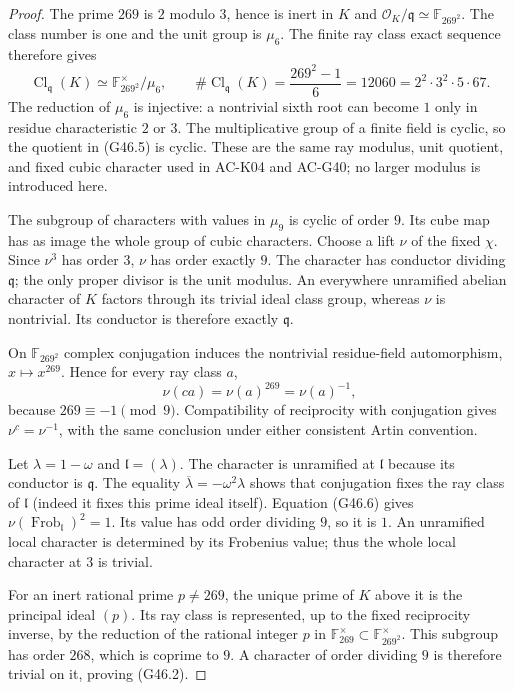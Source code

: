 \begin{proof}
The prime $269$ is $2$ modulo $3$, hence is inert in $K$ and
$\mathcal O_K/\mathfrak q\simeq\mathbb F_{269^2}$.
The class number is one and the unit group is $\mu_6$.
The finite ray class exact sequence therefore gives
\[
 \operatorname{Cl}_{\mathfrak q}(K)
       \simeq\mathbb F_{269^2}^{\times}/\mu_6,
 \qquad
 \#\operatorname{Cl}_{\mathfrak q}(K)
       =\frac{269^2-1}{6}
       =12060=2^2\cdot3^2\cdot5\cdot67.                \tag{G46.5}
\]
The reduction of $\mu_6$ is injective: a nontrivial sixth root
can become $1$ only in residue characteristic $2$ or $3$.
The multiplicative group of a finite field is cyclic, so the
quotient in (G46.5) is cyclic.  These are the same ray modulus,
unit quotient, and fixed cubic character used in AC-K04 and
AC-G40; no larger modulus is introduced here.

The subgroup of characters with values in $\mu_9$ is cyclic
of order $9$.  Its cube map has as image the whole group of
cubic characters.  Choose a lift $\nu$ of the fixed $\chi$.
Since $\nu^3$ has order $3$, $\nu$ has order exactly $9$.
The character has conductor dividing $\mathfrak q$; the only
proper divisor is the unit modulus.  An everywhere unramified
abelian character of $K$ factors through its trivial ideal class
group, whereas $\nu$ is nontrivial.  Its conductor is therefore
exactly $\mathfrak q$.

On $\mathbb F_{269^2}$ complex conjugation induces the
nontrivial residue-field automorphism, $x\mapsto x^{269}$.
Hence for every ray class $a$,
\[
          \nu(ca)=\nu(a)^{269}=\nu(a)^{-1},            \tag{G46.6}
\]
because $269\equiv-1\pmod9$.  Compatibility of reciprocity
with conjugation gives $\nu^c=\nu^{-1}$, with the same
conclusion under either consistent Artin convention.

Let $\lambda=1-\omega$ and $\mathfrak l=(\lambda)$.
The character is unramified at $\mathfrak l$ because its
conductor is $\mathfrak q$.  The equality
$\overline\lambda=-\omega^2\lambda$ shows that conjugation
fixes the ray class of $\mathfrak l$ (indeed it fixes this
prime ideal itself).  Equation (G46.6) gives
$\nu(\operatorname{Frob}_{\mathfrak l})^2=1$.
Its value has odd order dividing $9$, so it is $1$.
An unramified local character is determined by its Frobenius
value; thus the whole local character at $3$ is trivial.

For an inert rational prime $p\ne269$, the unique prime
of $K$ above it is the principal ideal $(p)$.
Its ray class is represented, up to the fixed reciprocity
inverse, by the reduction of the rational integer $p$ in
$\mathbb F_{269}^{\times}\subset\mathbb F_{269^2}^{\times}$.
This subgroup has order $268$, which is coprime to $9$.
A character of order dividing $9$ is therefore trivial on
it, proving (G46.2).


\end{proof}
